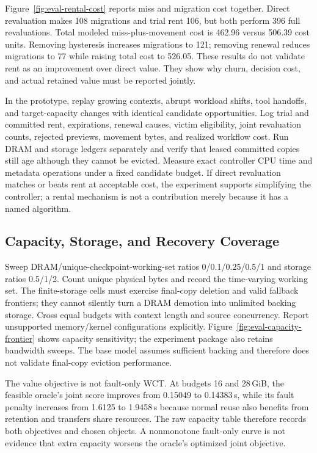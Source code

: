 \documentclass[sigplan,10pt,anonymous,nonacm]{acmart}
\begin{document}
Figure~\ref{fig:eval-rental-cost} reports miss and migration cost together.
Direct revaluation makes 108 migrations and trial rent 106, but both
perform 396 full revaluations. Total modeled miss-plus-movement cost
is 462.96 versus 506.39 cost units. Removing hysteresis increases
migrations to 121; removing renewal reduces migrations to 77 while
raising total cost to 526.05. These results do not validate rent as an
improvement over direct value. They show why churn, decision cost, and
actual retained value must be reported jointly.

In the prototype, replay growing contexts, abrupt workload shifts, tool
handoffs, and target-capacity changes with identical candidate opportunities.
Log trial and committed rent, expirations, renewal causes, victim eligibility,
joint revaluation counts, rejected previews, movement bytes, and realized
workflow cost. Run DRAM and storage ledgers separately and verify that
leased committed copies still age although they cannot be evicted.
Measure exact controller CPU time and metadata operations under a fixed
candidate budget. If direct revaluation matches or beats rent at acceptable
cost, the experiment supports simplifying the controller; a rental
mechanism is not a contribution merely because it has a named algorithm.

\FloatBarrier
\subsection{Capacity, Storage, and Recovery Coverage}

Sweep DRAM/unique-checkpoint-working-set ratios 0/0.1/0.25/0.5/1 and
storage ratios 0.5/1/2. Count unique physical bytes and record the
time-varying working set. The finite-storage cells must exercise final-copy
deletion and valid fallback frontiers; they cannot silently turn a DRAM
demotion into unlimited backing storage. Cross equal budgets with
context length and source concurrency. Report unsupported memory/kernel
configurations explicitly. Figure~\ref{fig:eval-capacity-frontier} shows capacity sensitivity; the experiment package also retains bandwidth sweeps. The base model assumes sufficient backing and therefore does not validate final-copy eviction performance.

The value objective is not fault-only WCT. At budgets 16 and 28\,GiB,
the feasible oracle's joint score improves from 0.15049 to 0.14383\,s,
while its fault penalty increases from 1.6125 to 1.9458\,s because
normal reuse also benefits from retention and transfers share resources.
The raw capacity table therefore records both objectives and chosen
objects. A nonmonotone fault-only curve is not evidence that extra
capacity worsens the oracle's optimized joint objective.
\end{document}
